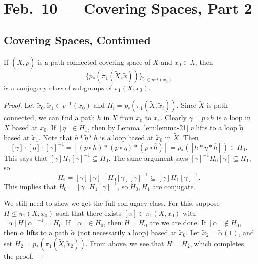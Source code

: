 \chapter{Feb.~10 --- Covering Spaces, Part 2}

\section{Covering Spaces, Continued}

\begin{lemma}\label{lem:lemma-22}
  If $(\widetilde{X}, p)$ is a path connected covering
  space of $X$ and $x_0 \in X$, then
  \[
    \{p_*(\pi_1(\widetilde{X}, \widetilde{x}))\}_{\widetilde{x} \in p^{-1}(x_0)}
  \]
  is a conjugacy class of subgroups of $\pi_1(X, x_0)$.
\end{lemma}

\begin{proof}
  Let $\widetilde{x}_0, \widetilde{x}_1 \in p^{-1}(x_0)$
  and $H_i = p_*(\pi_1(\widetilde{X}, \widetilde{x}_i))$.
  Since $\widetilde{X}$ is path connected, we can find a
  path $h$ in $\widetilde{X}$ from $\widetilde{x}_0$ to
  $\widetilde{x}_1$. Clearly $\gamma = p \circ h$ is a
  loop in $X$ based at $x_0$. If $[\eta] \in H_1$, then by
  Lemma \ref{lem:lemma-21} $\eta$ lifts to a loop
  $\widetilde{\eta}$ based at $\widetilde{x}_1$.
  Note that $h * \widetilde{\eta} * \overline{h}$ is a
  loop based at $\widetilde{x}_0$ in $\widetilde{X}$. Then
  \[
    [\gamma] \cdot [\eta] \cdot [\gamma]^{-1}
    = [(p \circ h) * (p \circ \widetilde{\eta}) * (p \circ \overline{h})]
    = p_*([h * \widetilde{\eta} * \overline{h}])
    \in H_0.
  \] 
  This says that $[\gamma] H_1 [\gamma]^{-1} \subseteq H_0$.
  The same argument says
  $[\gamma]^{-1} H_0 [\gamma] \subseteq H_1$, so
  \[
    H_0 = [\gamma] [\gamma]^{-1} H_0 [\gamma] [\gamma]^{-1}
    \subseteq [\gamma] H_1 [\gamma]^{-1}.
  \]
  This implies that $H_0 = [\gamma] H_1 [\gamma]^{-1}$, so
  $H_0, H_1$ are conjugate.

  We still need to show we
  get the full conjugacy class.
  For this, suppose $H \le \pi_1(X, x_0)$ such that
  there exists $[\alpha] \in \pi_1(X, x_0)$ with
  $[\alpha] H [\alpha]^{-1} = H_0$. If $[\alpha] \in H_0$,
  then $H = H_0$ are we are done. If $[\alpha] \notin H_0$,
  then $\alpha$ lifts to a path $\widetilde{\alpha}$ (not
  necessarily a loop) based at $\widetilde{x}_0$.
  Let $\widetilde{x}_2 = \widetilde{\alpha}(1)$, and set
  $H_2 = p_*(\pi_1(\widetilde{X}, \widetilde{x}_2))$.
  From above, we see that $H = H_2$, which completes the
  proof.
\end{proof}

